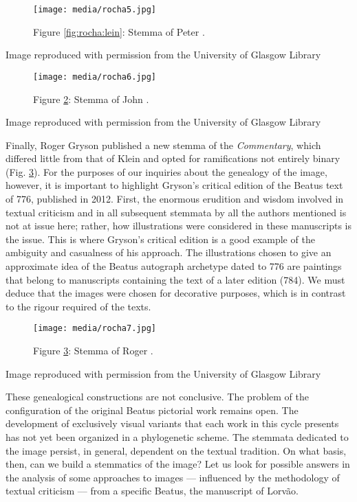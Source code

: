 \documentclass{article}
\begin{document}
\begin{figure}[H]
    \centering
    \texttt{[image: media/rocha5.jpg]}
    \caption{Figure \ref{fig:rocha:lein}: Stemma of Peter \citet{klein_altere_1976}.}
    \label{fig:rocha:klein}
\end{figure}


 Image reproduced with permission from the University of Glasgow Library 


 
\begin{figure}[H]
    \centering
    \texttt{[image: media/rocha6.jpg]}
    \caption{Figure \ref{fig:rocha:williams}: Stemma of John \citet{williams_illustrated_1994}.}
    \label{fig:rocha:williams}
\end{figure}


 Image reproduced with permission from the University of Glasgow Library 


 
Finally, Roger Gryson published a new stemma of the
\emph{Commentary}, which differed little from that of Klein and opted
for ramifications not entirely binary (Fig. \ref{fig:rocha:gryson}). For the purposes of our inquiries about the genealogy of the image, however, it is important to
highlight Gryson's critical edition of the Beatus text of 776, published
in 2012. First, the enormous erudition and wisdom involved in textual
criticism and in all subsequent stemmata by all the authors
mentioned is not at issue here; rather, how illustrations were
considered in these manuscripts is the issue. This is where Gryson's
critical edition is a good example of the ambiguity and casualness of
his approach. The illustrations chosen to give an approximate idea of
the Beatus autograph archetype dated to 776 are paintings that belong to
manuscripts containing the text of a later edition (784). We must deduce
that the images were chosen for decorative purposes, which is in
contrast to the rigour required of the texts.

\begin{figure}[H]
    \centering
    \texttt{[image: media/rocha7.jpg]}
    \caption{Figure \ref{fig:rocha:gryson}: Stemma of Roger \citet{gryson_beati_2012}.}
    \label{fig:rocha:gryson}
\end{figure}


 Image reproduced with permission from the University of Glasgow Library 


 
These genealogical constructions are not conclusive. The problem of the
configuration of the original Beatus pictorial work remains open. The
development of exclusively visual variants that each work in this cycle
presents has not yet been organized in a phylogenetic scheme. The
stemmata dedicated to the image persist, in general, dependent on
the textual tradition. On what basis, then, can we build a stemmatics of
the image? Let us look for possible answers in the analysis of some
approaches to images –– influenced by the methodology of textual
criticism –– from a specific Beatus, the manuscript of Lorvão.
\end{document}
